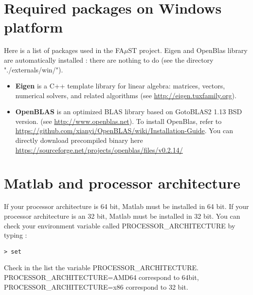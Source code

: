 \section{Required packages on Windows platform}\label{sec:WinRequiredPackages}
Here is a list of packages used in the FA$\mu$ST project. Eigen and OpenBlas library are automatically installed : there are nothing to do (see the directory "./externals/win/").
\begin{itemize}
\item \textbf{Eigen} is a C++ template library for linear algebra: matrices, vectors, numerical solvers, and related algorithms (see \url{http://eigen.tuxfamily.org}).
\item \textbf{OpenBLAS} is an optimized BLAS library based on GotoBLAS2 1.13 BSD version. (see \url{http://www.openblas.net}). To install OpenBlas, refer to \url{https://github.com/xianyi/OpenBLAS/wiki/Installation-Guide}. You can directly download precompiled binary here \url{https://sourceforge.net/projects/openblas/files/v0.2.14/}
\end{itemize}

\section{Matlab and processor architecture}\label{sec:ANNEXEMatlabArch}
If your processor architecture is 64 bit, Matlab must be installed in 64 bit. If your processor architecture is an 32 bit, Matlab must be installed in 32 bit. You can check your environment variable called PROCESSOR\_ARCHITECTURE by typing :
\begin{lstlisting}
> set
\end{lstlisting}
Check in the list the variable PROCESSOR\_ARCHITECTURE. \\
PROCESSOR\_ARCHITECTURE=AMD64 correspond to 64bit, 
PROCESSOR\_ARCHITECTURE=x86 correspond to 32 bit.



